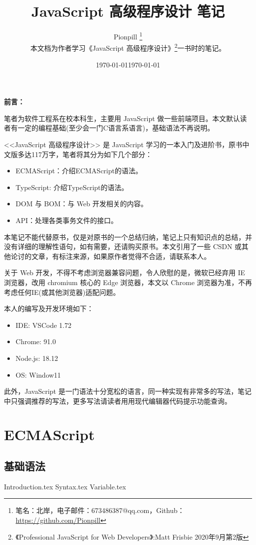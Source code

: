 \documentclass{PionpillNote-book}
\title{JavaScript 高级程序设计 笔记}
\author{
    Pionpill \footnote{笔名：北岸，电子邮件：673486387@qq.com，Github：\url{https://github.com/Pionpill}} \\
    本文档为作者学习《JavaScript 高级程序设计》\footnote{《Professional JavaScript for Web Developers》:Matt Frisbie 2020年9月第2版}一书时的笔记。\\
}
\date{\today}
\begin{document}
\pagestyle{plain}
\maketitle

\noindent\textbf{前言：}

笔者为软件工程系在校本科生，主要用 JavaScript 做一些前端项目。本文默认读者有一定的编程基础(至少会一门C语言系语言)，基础语法不再说明。

<<JavaScript 高级程序设计>> 是 JavaScript 学习的一本入门及进阶书，原书中文版多达117万字，笔者将其分为如下几个部分：
\begin{itemize}
    \item ECMAScript：介绍ECMAScript的语法。
    \item TypeScript: 介绍TypeScript的语法。 
    \item DOM 与 BOM：与 Web 开发相关的内容。
    \item API：处理各类事务文件的接口。
\end{itemize}

本笔记不能代替原书，仅是对原书的一个总结归纳，笔记上只有知识点的总结，并没有详细的理解性语句，如有需要，还请购买原书。本文引用了一些 CSDN 或其他论讨的文章，有标注来源，如果原作者觉得不合适，请联系本人。

关于 Web 开发，不得不考虑浏览器兼容问题，令人欣慰的是，微软已经弃用 IE 浏览器，改用 chromium 核心的 Edge 浏览器，本文以 Chrome 浏览器为准，不再考虑任何IE(或其他浏览器)适配问题。

本人的编写及开发环境如下：
\begin{itemize}
    \item IDE: VSCode 1.72 
    \item Chrome: 91.0
    \item Node.js: 18.12
    \item OS: Window11
\end{itemize}

此外，JavaScript 是一门语法十分宽松的语言，同一种实现有非常多的写法，笔记中只强调推荐的写法，更多写法请读者用用现代编辑器代码提示功能查询。

\date{\today}
\newpage

\tableofcontents

\newpage

\setcounter{page}{1} 
\pagestyle{fancy}

\part{ECMAScript}
\chapter{基础语法}
{Introduction.tex}
{Syntax.tex}
{Variable.tex}
\end{document}
